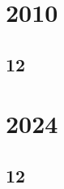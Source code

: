 \documentclass[11pt]{book}
\begin{document}
\section{2010}
\subsection{12}


\section{2024}
\subsection{12}


% 
\backmatter
\appendix
\iffalse
\chapter{Conic Lines}
\section{Pair of Straight Lines}
%

\section{Intersection of Conics}

\section{ Chords of a Conic}

\section{ Tangent and Normal}

\fi
%

%
%
%
\latexprintindex
\end{document}
